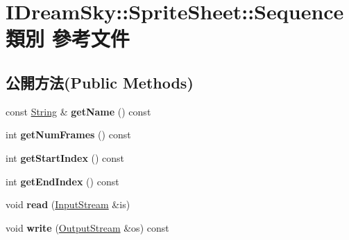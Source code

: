 \hypertarget{class_i_dream_sky_1_1_sprite_sheet_1_1_sequence}{}\section{I\+Dream\+Sky\+:\+:Sprite\+Sheet\+:\+:Sequence 類別 參考文件}
\label{class_i_dream_sky_1_1_sprite_sheet_1_1_sequence}
\subsection*{公開方法(Public Methods)}
\begin{DoxyCompactItemize}
\item 
const \hyperlink{class_i_dream_sky_1_1_string}{String} \& {\bfseries get\+Name} () const \hypertarget{class_i_dream_sky_1_1_sprite_sheet_1_1_sequence_a0f0fd0130cab6fed646fe9a0251b970f}{}\label{class_i_dream_sky_1_1_sprite_sheet_1_1_sequence_a0f0fd0130cab6fed646fe9a0251b970f}

\item 
int {\bfseries get\+Num\+Frames} () const \hypertarget{class_i_dream_sky_1_1_sprite_sheet_1_1_sequence_a3f8b042fce691a2808e6c8da0f4a7f85}{}\label{class_i_dream_sky_1_1_sprite_sheet_1_1_sequence_a3f8b042fce691a2808e6c8da0f4a7f85}

\item 
int {\bfseries get\+Start\+Index} () const \hypertarget{class_i_dream_sky_1_1_sprite_sheet_1_1_sequence_a6b59c58c7138c8afc78ba189312239f7}{}\label{class_i_dream_sky_1_1_sprite_sheet_1_1_sequence_a6b59c58c7138c8afc78ba189312239f7}

\item 
int {\bfseries get\+End\+Index} () const \hypertarget{class_i_dream_sky_1_1_sprite_sheet_1_1_sequence_a7665f7fde1d9f09bd6964fd2019d765c}{}\label{class_i_dream_sky_1_1_sprite_sheet_1_1_sequence_a7665f7fde1d9f09bd6964fd2019d765c}

\item 
void {\bfseries read} (\hyperlink{class_i_dream_sky_1_1_input_stream}{Input\+Stream} \&is)\hypertarget{class_i_dream_sky_1_1_sprite_sheet_1_1_sequence_a723bdf6be58264df0ec31b847ca0fa53}{}\label{class_i_dream_sky_1_1_sprite_sheet_1_1_sequence_a723bdf6be58264df0ec31b847ca0fa53}

\item 
void {\bfseries write} (\hyperlink{class_i_dream_sky_1_1_output_stream}{Output\+Stream} \&os) const \hypertarget{class_i_dream_sky_1_1_sprite_sheet_1_1_sequence_a7dd557db59de25a42b8df759722ca2a6}{}\label{class_i_dream_sky_1_1_sprite_sheet_1_1_sequence_a7dd557db59de25a42b8df759722ca2a6}

\end{DoxyCompactItemize}
